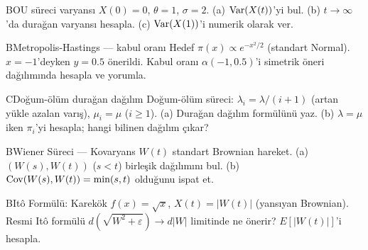 \begin{alistirma}[Al.10.9]{B}{OU süreci varyansı}
$X(0)=0$, $\theta=1$, $\sigma=2$. (a) $\operatorname{Var}(X(t))$'yi bul. (b) $t\to\infty$'da durağan varyansı hesapla. (c) $\operatorname{Var}(X(1))$'i numerik olarak ver.
\end{alistirma}

\begin{alistirma}[Al.10.10]{B}{Metropolis-Hastings --- kabul oranı}
Hedef $\pi(x)\propto e^{-x^2/2}$ (standart Normal). $x=-1$'deyken $y=0.5$ önerildi. Kabul oranı $\alpha(-1,0.5)$'i simetrik öneri dağılımında hesapla ve yorumla.
\end{alistirma}

\begin{alistirma}[Al.10.8]{C}{Doğum-ölüm durağan dağılım}
Doğum-ölüm süreci: $\lambda_i=\lambda/(i+1)$ (artan yükle azalan varış), $\mu_i=\mu$ ($i\geq1$). (a) Durağan dağılım formülünü yaz. (b) $\lambda=\mu$ iken $\pi_i$'yi hesapla; hangi bilinen dağılım çıkar?
\end{alistirma}

\begin{alistirma}[Al.10.11]{B}{Wiener Süreci --- Kovaryans}
$W(t)$ standart Brownian hareket. (a) $(W(s),W(t))$ ($s<t$) birleşik dağılımını bul. (b) $\operatorname{Cov}(W(s),W(t))=\min(s,t)$ olduğunu ispat et.
\end{alistirma}

\begin{alistirma}[Al.10.12]{B}{Itô Formülü: Karekök}
$f(x)=\sqrt{x}$, $X(t)=|W(t)|$ (yansıyan Brownian). Resmi Itô formülü $d(\sqrt{W^2+\varepsilon})\to d|W|$ limitinde ne önerir? $E[|W(t)|]$'i hesapla.
\end{alistirma}

